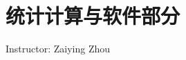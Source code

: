 \section{统计计算与软件部分}\label{SecStatisticalComputingAndSoftware}
\begin{center}
    Instructor: Zaiying Zhou
\end{center}


